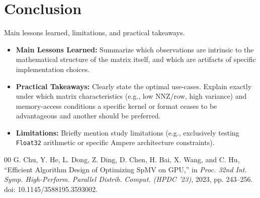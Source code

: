 \documentclass[conference]{IEEEtran}
\begin{document}
\section{Conclusion}
Main lessons learned, limitations, and practical takeaways.
\begin{itemize}
    \item \textbf{Main Lessons Learned:} Summarize which observations are intrinsic to the mathematical structure of the matrix itself, and which are artifacts of specific implementation choices.
    \item \textbf{Practical Takeaways:} Clearly state the optimal use-cases. Explain exactly under which matrix characteristics (e.g., low NNZ/row, high variance) and memory-access conditions a specific kernel or format ceases to be advantageous and another should be preferred.
    \item \textbf{Limitations:} Briefly mention study limitations (e.g., exclusively testing \texttt{Float32} arithmetic or specific Ampere architecture constraints).
\end{itemize}


\begin{thebibliography}{00}
 G. Chu, Y. He, L. Dong, Z. Ding, D. Chen, H. Bai, X. Wang, and C. Hu, ``Efficient Algorithm Design of Optimizing SpMV on GPU,'' in \textit{Proc. 32nd Int. Symp. High-Perform. Parallel Distrib. Comput. (HPDC '23)}, 2023, pp. 243–256. doi: 10.1145/3588195.3593002.
\end{thebibliography}
\end{document}
